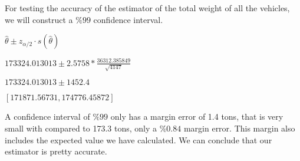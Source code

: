 \documentclass[12pt]{article}
\begin{document}
For testing the accuracy of the estimator of the total weight of all the vehicles, we will construct a $\%99$ confidence interval.
\begin{center}
    $\hat{\theta} \pm z_{\alpha/2}\cdot s(\hat{\theta})$

    $173324.013013 \pm 2.5758 * \frac{36312.385849}{\sqrt{4147}}$

    $173324.013013 \pm 1452.4$

    $[171871.56731, 174776.45872]$
\end{center}
A confidence interval of $\%99$ only has a margin error of 1.4 tons, that is very small with compared to 173.3 tons, only a $\%0.84$ margin error. This margin also includes the expected value we have calculated. We can conclude that our estimator is pretty accurate.
\end{document}
